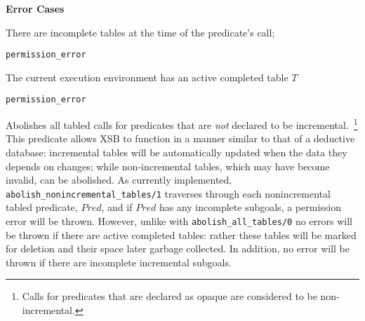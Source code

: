 \begin{description}
\begin{description}



{\bf Error Cases}
\bi
\item There are incomplete tables at the time of the predicate's call;
\bi
\item 	{\tt permission\_error}
\ei
\item The current execution environment has an active completed table $T$
\bi
\item 	{\tt permission\_error}
\ei
%
%
\ei


%
Abolishes all tabled calls for predicates that are {\em not} declared
to be incremental.~\footnote{Calls for predicates that are declared as
  opaque are considered to be non-incremental.} This predicate
allows XSB to function in a manner similar to that of a deductive
database: incremental tables will be automatically updated when the
data they depends on changes; while non-incremental tables, which may
have become invalid, can be abolished.  As currently implemented, {\tt
  abolish\_nonincremental\_tables/1} traverses through each
nonincremental tabled predicate, $Pred$, and if $Pred$ has any
incomplete subgoals, a permission error will be thrown.  However,
unlike with {\tt abolish\_all\_tables/0} no errors will be thrown if
there are active completed tables: rather these tables will be marked
for deletion and their space later garbage collected.  In addition, no
error will be thrown if there are incomplete incremental subgoals.

\end{description}
\end{description}
